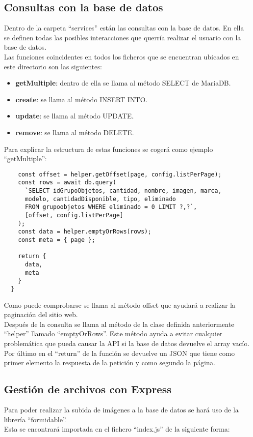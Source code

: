 \subsection{Consultas con la base de datos}
Dentro de la carpeta ``services'' están las consultas con la base de datos. En ella se definen todas las posibles interacciones que querría realizar el usuario con la base de datos.
\\Las funciones coincidentes en todos los ficheros que se encuentran ubicados en este directorio son las siguientes:
\begin{itemize}
    \item \textbf{getMultiple}: dentro de ella se llama al método SELECT de MariaDB.
    \item \textbf{create}: se llama al método INSERT INTO.
    \item \textbf{update}: se llama al método UPDATE.
    \item \textbf{remove}: se llama al método DELETE.
\end{itemize}
Para explicar la estructura de estas funciones se cogerá como ejemplo ``getMultiple'':
\begin{verbatim}
    const offset = helper.getOffset(page, config.listPerPage);
    const rows = await db.query(
      `SELECT idGrupoObjetos, cantidad, nombre, imagen, marca, 
      modelo, cantidadDisponible, tipo, eliminado 
      FROM grupoobjetos WHERE eliminado = 0 LIMIT ?,?`,
      [offset, config.listPerPage]
    );
    const data = helper.emptyOrRows(rows);
    const meta = { page };
  
    return {
      data,
      meta
    }
  }
\end{verbatim}
Como puede comprobarse se llama al método offset que ayudará a realizar la paginación del sitio web.
\\Después de la consulta se llama al método de la clase definida anteriormente ``helper'' llamado ``emptyOrRows''. Este método ayuda a evitar cualquier problemática que pueda causar la API si la base de datos devuelve el array vacío.
\\Por último en el ``return'' de la función se devuelve un JSON que tiene como primer elemento la respuesta de la petición y como segundo la página.

\subsection{Gestión de archivos con Express}

Para poder realizar la subida de imágenes a la base de datos se hará uso de la librería ``formidable''.
\\Esta se encontrará importada en el fichero ``index.js'' de la siguiente forma:

